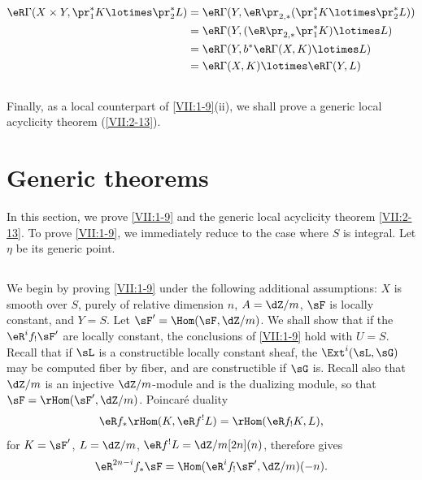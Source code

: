 \begin{align*}
  \eR\Gamma(X\times Y,\pr_1^\ast K\lotimes \pr_2^\ast L)
    &= \eR\Gamma(Y,\eR \pr_{2,\ast}(\pr_1^\ast K\lotimes \pr_2^\ast L)) \\
    &= \eR\Gamma(Y,(\eR\pr_{2,\ast}\pr_1^\ast K)\lotimes L) \\
    &= \eR\Gamma(Y,b^\ast \eR\Gamma(X,K)\lotimes L) \\
    &= \eR\Gamma(X,K)\lotimes \eR\Gamma(Y,L)
\end{align*}






\subsection{}\label{VII:1-12}

Finally, as a local counterpart of \ref{VII:1-9}(ii), we shall prove a
generic local acyclicity theorem (\ref{VII:2-13}).











\section{Generic theorems}\label{VII:2}

In this section, we prove \ref{VII:1-9} and the generic local acyclicity theorem
\ref{VII:2-13}. To prove \ref{VII:1-9}, we immediately reduce to the case where
$S$ is integral. Let $\eta$ be its generic point.





\subsection{}\label{VII:2-1}

We begin by proving \ref{VII:1-9} under the following additional assumptions:
$X$ is smooth over $S$, purely of relative dimension $n$, $A=\dZ/m$, $\sF$ is
locally constant, and $Y=S$. Let $\sF'=\Hom(\sF,\dZ/m)$. We shall show that if
the $\eR^i f_! \sF'$ are locally constant, the conclusions of \ref{VII:1-9}
hold with $U=S$. Recall that if $\sL$ is a constructible locally constant
sheaf, the $\Ext^i(\sL,\sG)$ may be computed fiber by fiber, and are
constructible if $\sG$ is. Recall also that $\dZ/m$ is an injective
$\dZ/m$-module and is the dualizing module, so that
$\sF=\rHom(\sF',\dZ/m)$. Poincaré duality
\[
  \eR f_\ast \rHom(K,\eR f^! L) = \rHom(\eR f_! K,L) \text{,} 
\]
for $K=\sF'$, $L=\dZ/m$, $\eR f^! L = \dZ/m[2n](n)$, therefore gives
\[
  \eR^{2n-i} f_\ast \sF = \Hom(\eR^i f_! \sF',\dZ/m)(-n) \text{.} 
\]


